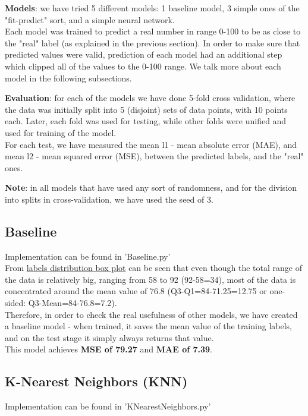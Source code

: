 \documentclass[11pt, oneside]{article}   	%
\begin{document}
\textbf{Models}: we have tried 5 different models: 1 baseline model, 3 simple ones of the "fit-predict" sort, and a simple neural network.\\ 
Each model was trained to predict a real number in range 0-100 to be as close to the "real" label (as explained in the previous section). In order to make sure that predicted values were valid, prediction of each model had an additional step which clipped all of the values to the 0-100 range.
We talk more about each model in the following subsections.

\textbf{Evaluation}: for each of the models we have done 5-fold cross validation, where the data was initially split into 5 (disjoint) sets of data points, with 10 points each. Later, each fold was used for testing, while other folds were unified and used for training of the model.\\
For each test, we have measured the mean l1 - mean absolute error (MAE), and mean l2 - mean squared error (MSE), between the predicted labels, and the "real" ones.

\textbf{Note}: in all models that have used any sort of randomness, and for the division into splits in cross-validation, we have used the seed of 3.

\subsection{Baseline}
Implementation can be found in 'Baseline.py'\\

From \hyperref[fig:sureness_stats]{labels distribution box plot} can be seen that even though the total range of the data is relatively big, ranging from 58 to 92 (92-58=34), most of the data is concentrated around the mean value of 76.8 (Q3-Q1=84-71.25=12.75 or one-sided: Q3-Mean=84-76.8=7.2).\\
Therefore, in order to check the real usefulness of other models, we have created a baseline model - when trained, it saves the mean value of the training labels, and on the test stage it simply always returns that value.\\

This model achieves \textbf{MSE of 79.27} and \textbf{MAE of 7.39}.

\subsection{K-Nearest Neighbors (KNN)}
Implementation can be found in 'KNearestNeighbors.py'\\
\end{document}

